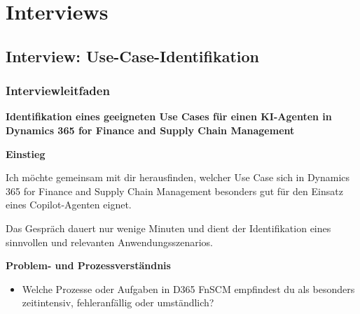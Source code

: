 
\section{Interviews}
\subsection{Interview: Use-Case-Identifikation}
\subsubsection{Interviewleitfaden}
\label{anhang:InterviewleitfadenUseCase}
\textbf{Identifikation eines geeigneten Use Cases für einen KI-Agenten in Dynamics 365 for Finance and Supply Chain Management}

\vspace{0.5em}

\textbf{Einstieg}

Ich möchte gemeinsam mit dir herausfinden, welcher Use Case sich in Dynamics 365 for Finance and Supply Chain Management besonders gut für den Einsatz eines Copilot-Agenten eignet.

Das Gespräch dauert nur wenige Minuten und dient der Identifikation eines sinnvollen und relevanten Anwendungsszenarios.

\vspace{0.5em}

\textbf{Problem- und Prozessverständnis}

\begin{itemize}
    \item Welche Prozesse oder Aufgaben in D365 FnSCM empfindest du als besonders zeitintensiv, fehleranfällig oder umständlich?
\end{itemize}

